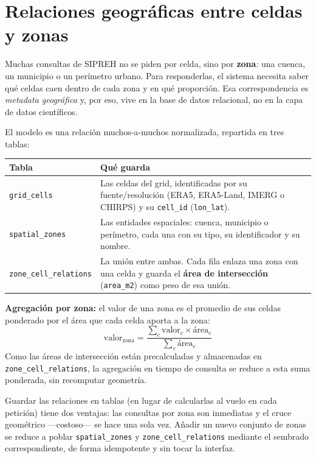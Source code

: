 \section{Relaciones geográficas entre celdas y zonas}
\label{sec:relaciones_geograficas}

Muchas consultas de SIPREH no se piden por celda, sino por \textbf{zona}: una cuenca, un municipio o un perímetro urbano. Para responderlas, el sistema necesita saber qué celdas caen dentro de cada zona y en qué proporción. Esa correspondencia es \emph{metadata geográfica} y, por eso, vive en la base de datos relacional, no en la capa de datos científicos.

El modelo es una relación muchos-a-muchos normalizada, repartida en tres tablas:

\begin{center}
\small
\begin{tabular}{@{}lp{8.6cm}@{}}
\toprule
\textbf{Tabla} & \textbf{Qué guarda} \\
\midrule
\texttt{grid\_cells}         & Las celdas del grid, identificadas por su fuente/resolución (ERA5, ERA5-Land, IMERG o CHIRPS) y su \texttt{cell\_id} (\texttt{lon\_lat}). \\
\texttt{spatial\_zones}      & Las entidades espaciales: cuenca, municipio o perímetro, cada una con su tipo, su identificador y su nombre. \\
\texttt{zone\_cell\_relations}& La unión entre ambas. Cada fila enlaza una zona con una celda y guarda el \textbf{área de intersección} (\texttt{area\_m2}) como peso de esa unión. \\
\bottomrule
\end{tabular}
\end{center}

\begin{definition}
\textbf{Agregación por zona:} el valor de una zona es el promedio de sus celdas ponderado por el área que cada celda aporta a la zona:
\[
\text{valor}_{\text{zona}} = \frac{\sum_c \text{valor}_c \times \text{área}_c}{\sum_c \text{área}_c}
\]
Como las áreas de intersección están precalculadas y almacenadas en \texttt{zone\_cell\_relations}, la agregación en tiempo de consulta se reduce a esta suma ponderada, sin recomputar geometría.
\end{definition}

\begin{remark}
Guardar las relaciones en tablas (en lugar de calcularlas al vuelo en cada petición) tiene dos ventajas: las consultas por zona son inmediatas y el cruce geométrico ---costoso--- se hace una sola vez. Añadir un nuevo conjunto de zonas se reduce a poblar \texttt{spatial\_zones} y \texttt{zone\_cell\_relations} mediante el sembrado correspondiente, de forma idempotente y sin tocar la interfaz.
\end{remark}
